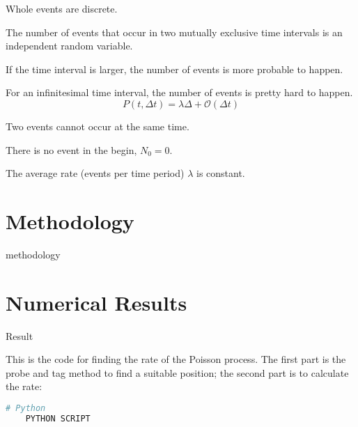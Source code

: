 \documentclass[12 pt]{article}
\begin{document}
  \begin{description}[style=unboxed, leftmargin = 36 pt, labelindent = 24 pt]
      \item[$\bullet$] Whole events are discrete.
      \item[$\bullet$] The number of events that occur in two mutually exclusive time intervals is an independent random variable.
      \item[$\bullet$] If the time interval is larger, the number of events is more probable to happen.
      \item[$\bullet$] For an infinitesimal time interval, the number of events is pretty hard to happen.
      \[P(t, \Delta t)=\lambda \Delta +\mathcal{O}(\Delta t)\]
      \item[$\bullet$] Two events cannot occur at the same time.
      \item[$\bullet$] There is no event in the begin, $N_0 = 0$.
      \item[$\bullet$]The average rate (events per time period) $\lambda$ is constant.
  \end{description}

\section{Methodology}
    
  methodology

\section{Numerical Results}

Result

    \noindent This is the code for finding the rate of the Poisson process. The first part is the probe and tag method to find a suitable position; the second part is to calculate the rate:

    \begin{lstlisting}[language={Python}]
        # Python 
    PYTHON SCRIPT
	  \end{lstlisting}

\end{document}
